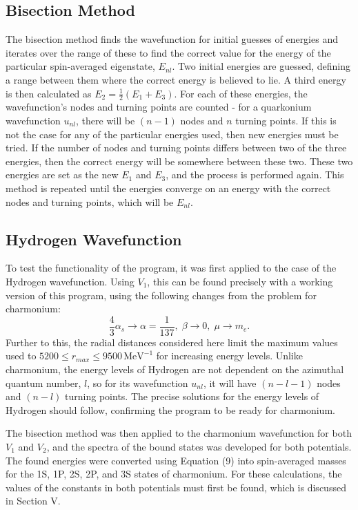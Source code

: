 \documentclass[10pt, twocolumn]{article}
\begin{document}
\subsection{Bisection Method}
The bisection method finds the wavefunction for initial guesses of energies and iterates over the range of these to find the correct value for the energy of the particular spin-averaged eigenstate, $E_{nl}$.
Two initial energies are guessed, defining a range between them where the correct energy is believed to lie.
A third energy is then calculated as $E_2 = \frac12 (E_1+E_3)$.
For each of these energies, the wavefunction's nodes and turning points are counted - for a quarkonium wavefunction $u_{nl}$, there will be $(n-1)$ nodes and $n$ turning points.
If this is not the case for any of the particular energies used, then new energies must be tried. 
If the number of nodes and turning points differs between two of the three energies, then the correct energy will be somewhere between these two. 
These two energies are set as the new $E_1$ and $E_3$, and the process is performed again.
This method is repeated until the energies converge on an energy with the correct nodes and turning points, which will be $E_{nl}$.

\subsection{Hydrogen Wavefunction}
To test the functionality of the program, it was first applied to the case of the Hydrogen wavefunction. 
Using $V_1$, this can be found precisely with a working version of this program, using the following changes from the problem for charmonium:
\begin{equation}
    \frac43 \alpha_s \to \alpha=\frac{1}{137},\; \beta \to 0,\; \mu \to m_e.
\end{equation}
Further to this, the radial distances considered here limit the maximum values used to $5200 \leq r_{max} \leq 9500\,\text{MeV}^{-1}$ for increasing energy levels.
Unlike charmonium, the energy levels of Hydrogen are not dependent on the azimuthal quantum number, $l$, so for its wavefunction $u_{nl}$, it will have $(n-l-1)$ nodes and $(n-l)$ turning points.
The precise solutions for the energy levels of Hydrogen should follow, confirming the program to be ready for charmonium.

The bisection method was then applied to the charmonium wavefunction for both $V_1$ and $V_2$, and the spectra of the bound states was developed for both potentials. 
The found energies were converted using Equation (9) into spin-averaged masses for the 1S, 1P, 2S, 2P, and 3S states of charmonium. 
For these calculations, the values of the constants in both potentials must first be found, which is discussed in Section \RN{5}.
\end{document}
